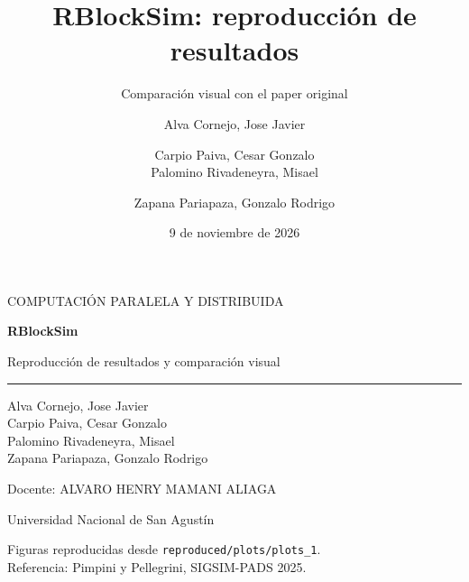 \documentclass[aspectratio=169,11pt]{beamer}
\title{RBlockSim: reproducción de resultados}
\subtitle{Comparación visual con el paper original}
\author{Alva Cornejo, Jose Javier \and Carpio Paiva, Cesar Gonzalo\\
Palomino Rivadeneyra, Misael \and Zapana Pariapaza, Gonzalo Rodrigo}
\institute{Universidad Nacional de San Agustín}
\date{9 de noviembre de 2026}
\begin{document}
\begin{frame}[plain]
  \vspace{.35cm}
  {\color{teal}\large COMPUTACIÓN PARALELA Y DISTRIBUIDA\par}
  \vspace{.2cm}
  {\color{navy}\LARGE\bfseries RBlockSim\par}
  {\color{navy}\Large Reproducción de resultados y comparación visual\par}
  \vspace{.35cm}\color{teal}\rule{.16\textwidth}{2pt}\par\vspace{.3cm}
  {\normalsize Alva Cornejo, Jose Javier\\
  Carpio Paiva, Cesar Gonzalo\\
  Palomino Rivadeneyra, Misael\\
  Zapana Pariapaza, Gonzalo Rodrigo\par}
  \vspace{.35cm}
  {\small Docente: ALVARO HENRY MAMANI ALIAGA\par}
  {\small Universidad Nacional de San Agustín\par}
  \vfill
  {\footnotesize Figuras reproducidas desde \texttt{reproduced/plots/plots\_1}.\\
  Referencia: Pimpini y Pellegrini, SIGSIM-PADS 2025.}
\end{frame}
\end{document}
